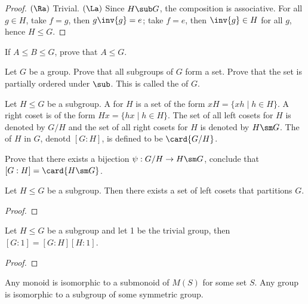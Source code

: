 \documentclass[10pt]{article}
\begin{document}
\begin{proof}
    $(\Ra)$ Trivial. $(\La)$ Since $H\sub G$, the composition is associative. For all $g\in H$, take $f=g$, then $g\inv{g}=e$; take $f=e$, then $\inv{g}\in H$ for all $g$, hence $H\le G$.
\end{proof}
\begin{problem}
    If $A\le B\le G$, prove that $A\le G$.
\end{problem}
\begin{problem}
    Let $G$ be a group. Prove that all subgroups of $G$ form a set. Prove that the set is partially ordered under $\sub$. This is called the  of $G$.
\end{problem}
\begin{definition}
    Let $H\le G$ be a subgroup. A  for $H$ is a set of the form $xH=\{xh\mid h\in H\}$. A right coset is of the form $Hx=\{hx\mid h\in H\}$. The set of all left cosets for $H$ is denoted by $G/H$ and the set of all right cosets for $H$ is denoted by $H\sm G$. The  of $H$ in $G$, denotd $[G:H]$, is defined to be $\card{G/H}$.
\end{definition}
\begin{problem}
    Prove that there exists a bijection $\psi:G/H\to H\sm G$, conclude that $[G:H]=\card{H\sm G}$.
\end{problem}
\begin{problem}
    Let $H\le G$ be a subgroup. Then there exists a set of left cosets that partitions $G$.
\end{problem}
\begin{proof}
    
\end{proof}
\begin{proposition}
    Let $H\le G$ be a subgroup and let 1 be the trivial group, then $[G:1]=[G:H][H:1]$.
\end{proposition}
\begin{proof}
    
\end{proof}
\begin{theorem}
    Any monoid is isomorphic to a submonoid of $M(S)$ for some set $S$. Any group is isomorphic to a subgroup of some symmetric group.
\end{theorem}
\end{document}
